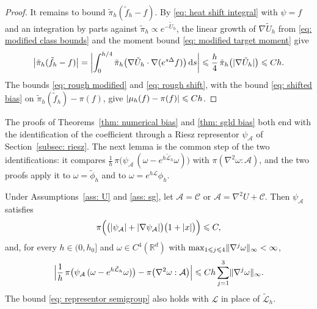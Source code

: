 \begin{proof}
    It remains to bound $\tilde\pi_h( \tilde f_h - f )$. By \eqref{eq: heat shift integral} with $\psi = f$ and an integration by parts against $\tilde\pi_h \propto e^{-\tilde U_h}$, the linear growth of $\nabla \tilde U_h$ from \eqref{eq: modified class bounds} and the moment bound \eqref{eq: modified target moment} give
    \begin{equation}
        \bigl| \tilde\pi_h( \tilde f_h - f ) \bigr| = \biggl| \int_0^{h/4} \tilde\pi_h\bigl( \nabla \tilde U_h \cdot \nabla ( e^{s\Delta} f ) \bigr)\, \mathrm{d} s \biggr| \leqslant \frac h4\, \tilde\pi_h\bigl( |\nabla \tilde U_h| \bigr) \leqslant C h .
        \label{eq: rough shift}
    \end{equation}
    The bounds \eqref{eq: rough modified} and \eqref{eq: rough shift}, with the bound \eqref{eq: shifted bias} on $\tilde\pi_h(\tilde f_h) - \pi(f)$, give $|\mu_h(f) - \pi(f)| \leqslant C h$.
\end{proof}

The proofs of Theorems~\ref{thm: numerical bias} and \ref{thm: sgld bias} both end with the identification of the coefficient through a Riesz representor $\psi_{\mathcal A}$ of Section~\ref{subsec: riesz}. The next lemma is the common step of the two identifications: it compares $\frac1h\, \pi\bigl( \psi_{\mathcal A}\, ( \omega - e^{h\tilde{\mathcal L}_h} \omega ) \bigr)$ with $\pi( \nabla^2 \omega : \mathcal A )$, and the two proofs apply it to $\omega = \tilde\phi_h$ and to $\omega = e^{h\mathcal L} \phi_h$.

\begin{lemma}
\label{lem: representor semigroup}
    Under Assumptions~\ref{ass: U} and \ref{ass: sg}, let $\mathcal A = \mathcal C$ or $\mathcal A = \nabla^2 U + \mathcal C$. Then $\psi_{\mathcal A}$ satisfies
    \begin{equation}
        \pi\Bigl( \bigl( |\psi_{\mathcal A}| + |\nabla \psi_{\mathcal A}| \bigr) \bigl( 1 + |x| \bigr) \Bigr) \leqslant C ,
        \label{eq: psi moments}
    \end{equation}
    and, for every $h \in (0,h_0]$ and $\omega \in C^4(\mathbb R^d)$ with $\max_{1 \leqslant j \leqslant 4} \lVert \nabla^j \omega \rVert_\infty < \infty$,
    \begin{equation}
        \Bigl| \frac1h\, \pi\bigl( \psi_{\mathcal A}\, ( \omega - e^{h\tilde{\mathcal L}_h} \omega ) \bigr) - \pi\bigl( \nabla^2 \omega : \mathcal A \bigr) \Bigr| \leqslant C h \sum_{j=1}^{3} \lVert \nabla^j \omega \rVert_\infty .
        \label{eq: representor semigroup}
    \end{equation}
    The bound \eqref{eq: representor semigroup} also holds with $\mathcal L$ in place of $\tilde{\mathcal L}_h$.
\end{lemma}

